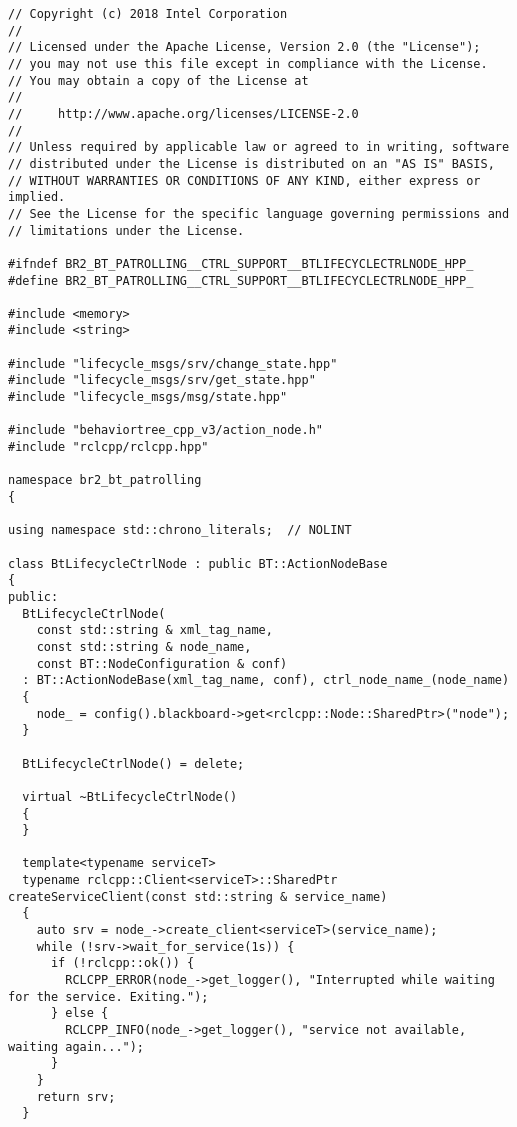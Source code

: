  \footnotesize
\begin{tcolorbox}[sharp corners, colframe=gray!80, colback=LightGray, left=0pt, top=0pt, bottom=0pt, title=\texttt{br2\_bt\_patrolling/include/br2\_bt\_patrolling/ctrl\_support/BTLifecycleCtrlNode.hpp}]
  \begin{verbatim}
// Copyright (c) 2018 Intel Corporation
//
// Licensed under the Apache License, Version 2.0 (the "License");
// you may not use this file except in compliance with the License.
// You may obtain a copy of the License at
//
//     http://www.apache.org/licenses/LICENSE-2.0
//
// Unless required by applicable law or agreed to in writing, software
// distributed under the License is distributed on an "AS IS" BASIS,
// WITHOUT WARRANTIES OR CONDITIONS OF ANY KIND, either express or implied.
// See the License for the specific language governing permissions and
// limitations under the License.

#ifndef BR2_BT_PATROLLING__CTRL_SUPPORT__BTLIFECYCLECTRLNODE_HPP_
#define BR2_BT_PATROLLING__CTRL_SUPPORT__BTLIFECYCLECTRLNODE_HPP_

#include <memory>
#include <string>

#include "lifecycle_msgs/srv/change_state.hpp"
#include "lifecycle_msgs/srv/get_state.hpp"
#include "lifecycle_msgs/msg/state.hpp"

#include "behaviortree_cpp_v3/action_node.h"
#include "rclcpp/rclcpp.hpp"

namespace br2_bt_patrolling
{

using namespace std::chrono_literals;  // NOLINT

class BtLifecycleCtrlNode : public BT::ActionNodeBase
{
public:
  BtLifecycleCtrlNode(
    const std::string & xml_tag_name,
    const std::string & node_name,
    const BT::NodeConfiguration & conf)
  : BT::ActionNodeBase(xml_tag_name, conf), ctrl_node_name_(node_name)
  {
    node_ = config().blackboard->get<rclcpp::Node::SharedPtr>("node");
  }

  BtLifecycleCtrlNode() = delete;

  virtual ~BtLifecycleCtrlNode()
  {
  }

  template<typename serviceT>
  typename rclcpp::Client<serviceT>::SharedPtr createServiceClient(const std::string & service_name)
  {
    auto srv = node_->create_client<serviceT>(service_name);
    while (!srv->wait_for_service(1s)) {
      if (!rclcpp::ok()) {
        RCLCPP_ERROR(node_->get_logger(), "Interrupted while waiting for the service. Exiting.");
      } else {
        RCLCPP_INFO(node_->get_logger(), "service not available, waiting again...");
      }
    }
    return srv;
  }


\end{verbatim}
\end{tcolorbox}
